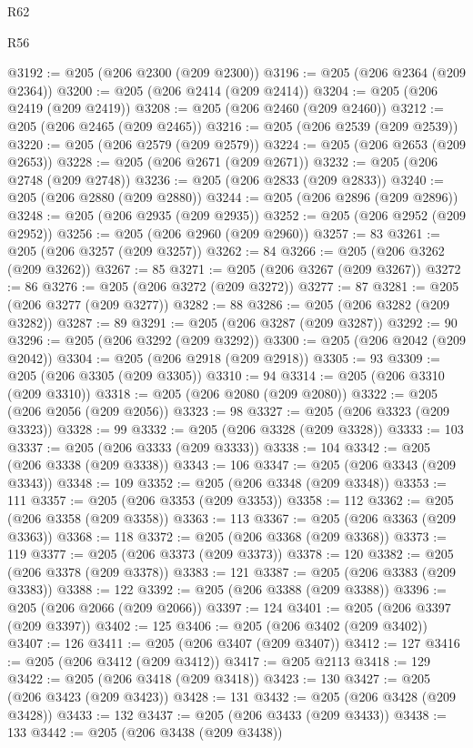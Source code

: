 \begin{lexlean}{R62}
\begin{lexlean}{R56}
\begin{coremodule}
{{{{{{{{{{{{{{{{{{{{{{{{{{{{{{{{{{{{{{{{{{{{{{{{{{{{{{{{{{{{{{{{{{{{{{{{{{{{{{{{{{{{{{{{{{{{{{{{{{{{{{{{{{{{{{{{{{{{{{{{{{{{{{{{{{{{{{{{{{{{{{{{{{{{{{{{{{{{{{{{{{{{{{{{{{{{{{{{{{{{{{{{{{{{{{{{{{{{{{{{{{{{{{{{{{{@3192 := @205 (@206 @2300 (@209 @2300))
@3196 := @205 (@206 @2364 (@209 @2364))
@3200 := @205 (@206 @2414 (@209 @2414))
@3204 := @205 (@206 @2419 (@209 @2419))
@3208 := @205 (@206 @2460 (@209 @2460))
@3212 := @205 (@206 @2465 (@209 @2465))
@3216 := @205 (@206 @2539 (@209 @2539))
@3220 := @205 (@206 @2579 (@209 @2579))
@3224 := @205 (@206 @2653 (@209 @2653))
@3228 := @205 (@206 @2671 (@209 @2671))
@3232 := @205 (@206 @2748 (@209 @2748))
@3236 := @205 (@206 @2833 (@209 @2833))
@3240 := @205 (@206 @2880 (@209 @2880))
@3244 := @205 (@206 @2896 (@209 @2896))
@3248 := @205 (@206 @2935 (@209 @2935))
@3252 := @205 (@206 @2952 (@209 @2952))
@3256 := @205 (@206 @2960 (@209 @2960))
@3257 := 83
@3261 := @205 (@206 @3257 (@209 @3257))
@3262 := 84
@3266 := @205 (@206 @3262 (@209 @3262))
@3267 := 85
@3271 := @205 (@206 @3267 (@209 @3267))
@3272 := 86
@3276 := @205 (@206 @3272 (@209 @3272))
@3277 := 87
@3281 := @205 (@206 @3277 (@209 @3277))
@3282 := 88
@3286 := @205 (@206 @3282 (@209 @3282))
@3287 := 89
@3291 := @205 (@206 @3287 (@209 @3287))
@3292 := 90
@3296 := @205 (@206 @3292 (@209 @3292))
@3300 := @205 (@206 @2042 (@209 @2042))
@3304 := @205 (@206 @2918 (@209 @2918))
@3305 := 93
@3309 := @205 (@206 @3305 (@209 @3305))
@3310 := 94
@3314 := @205 (@206 @3310 (@209 @3310))
@3318 := @205 (@206 @2080 (@209 @2080))
@3322 := @205 (@206 @2056 (@209 @2056))
@3323 := 98
@3327 := @205 (@206 @3323 (@209 @3323))
@3328 := 99
@3332 := @205 (@206 @3328 (@209 @3328))
@3333 := 103
@3337 := @205 (@206 @3333 (@209 @3333))
@3338 := 104
@3342 := @205 (@206 @3338 (@209 @3338))
@3343 := 106
@3347 := @205 (@206 @3343 (@209 @3343))
@3348 := 109
@3352 := @205 (@206 @3348 (@209 @3348))
@3353 := 111
@3357 := @205 (@206 @3353 (@209 @3353))
@3358 := 112
@3362 := @205 (@206 @3358 (@209 @3358))
@3363 := 113
@3367 := @205 (@206 @3363 (@209 @3363))
@3368 := 118
@3372 := @205 (@206 @3368 (@209 @3368))
@3373 := 119
@3377 := @205 (@206 @3373 (@209 @3373))
@3378 := 120
@3382 := @205 (@206 @3378 (@209 @3378))
@3383 := 121
@3387 := @205 (@206 @3383 (@209 @3383))
@3388 := 122
@3392 := @205 (@206 @3388 (@209 @3388))
@3396 := @205 (@206 @2066 (@209 @2066))
@3397 := 124
@3401 := @205 (@206 @3397 (@209 @3397))
@3402 := 125
@3406 := @205 (@206 @3402 (@209 @3402))
@3407 := 126
@3411 := @205 (@206 @3407 (@209 @3407))
@3412 := 127
@3416 := @205 (@206 @3412 (@209 @3412))
@3417 := @205 @2113
@3418 := 129
@3422 := @205 (@206 @3418 (@209 @3418))
@3423 := 130
@3427 := @205 (@206 @3423 (@209 @3423))
@3428 := 131
@3432 := @205 (@206 @3428 (@209 @3428))
@3433 := 132
@3437 := @205 (@206 @3433 (@209 @3433))
@3438 := 133
@3442 := @205 (@206 @3438 (@209 @3438))
}}}}}}}}}}}}}}}}}}}}}}}}}}}}}}}}}}}}}}}}}}}}}}}}}}}}}}}}}}}}}}}}}}}}}}}}}}}}}}}}}}}}}}}}}}}}}}}}}}}}}}}}}}}}}}}}}}}}}}}}}}}}}}}}}}}}}}}}}}}}}}}}}}}}}}}}}}}}}}}}}}}}}}}}}}}}}}}}}}}}}}}}}}}}}}}}}}}}}}}}}}}}}}}}}}}
\end{coremodule}
\end{lexlean}
\end{lexlean}

